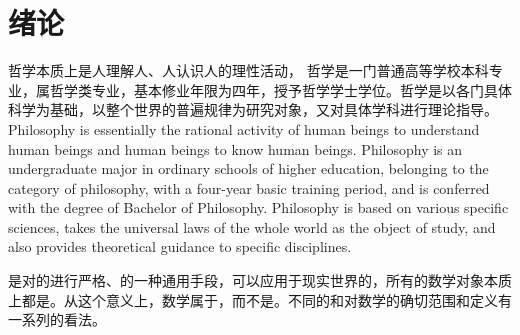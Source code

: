 \chapter{绪论}

哲学本质上是人理解人、人认识人的理性活动， 哲学是一门普通高等学校本科专业，属哲学类专业，基本修业年限为四年，授予哲学学士学位。哲学是以各门具体科学为基础，以整个世界的普遍规律为研究对象，又对具体学科进行理论指导。Philosophy is essentially the rational activity of human beings to understand human beings and human beings to know human beings. Philosophy is an undergraduate major in ordinary schools of higher education, belonging to the category of philosophy, with a four-year basic training period, and is conferred with the degree of Bachelor of Philosophy. Philosophy is based on various specific sciences, takes the universal laws of the whole world as the object of study, and also provides theoretical guidance to specific disciplines.

是对的进行严格、的一种通用手段，可以应用于现实世界的，所有的数学对象本质上都是。从这个意义上，数学属于，而不是。不同的和对数学的确切范围和定义有一系列的看法。
